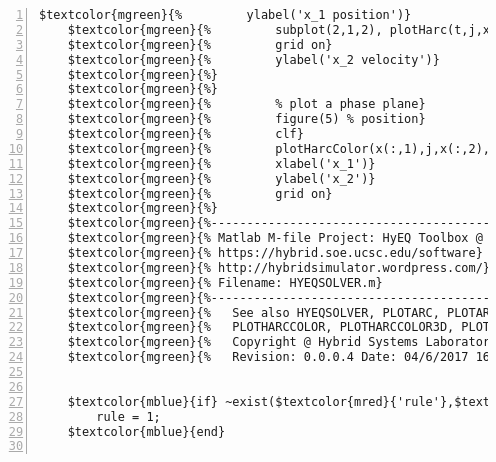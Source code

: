 \begin{Verbatim}[commandchars=\$\{\},numbers=left,numbersep=2pt]
    $textcolor{mgreen}{%         ylabel('x_1 position')} 
    $textcolor{mgreen}{%         subplot(2,1,2), plotHarc(t,j,x(:,2));} 
    $textcolor{mgreen}{%         grid on} 
    $textcolor{mgreen}{%         ylabel('x_2 velocity')} 
    $textcolor{mgreen}{%} 
    $textcolor{mgreen}{%} 
    $textcolor{mgreen}{%         % plot a phase plane} 
    $textcolor{mgreen}{%         figure(5) % position} 
    $textcolor{mgreen}{%         clf} 
    $textcolor{mgreen}{%         plotHarcColor(x(:,1),j,x(:,2),t);} 
    $textcolor{mgreen}{%         xlabel('x_1')} 
    $textcolor{mgreen}{%         ylabel('x_2')} 
    $textcolor{mgreen}{%         grid on} 
    $textcolor{mgreen}{%} 
    $textcolor{mgreen}{%--------------------------------------------------------------------------} 
    $textcolor{mgreen}{% Matlab M-file Project: HyEQ Toolbox @  Hybrid Systems Laboratory (HSL),} 
    $textcolor{mgreen}{% https://hybrid.soe.ucsc.edu/software} 
    $textcolor{mgreen}{% http://hybridsimulator.wordpress.com/} 
    $textcolor{mgreen}{% Filename: HYEQSOLVER.m} 
    $textcolor{mgreen}{%--------------------------------------------------------------------------} 
    $textcolor{mgreen}{%   See also HYEQSOLVER, PLOTARC, PLOTARC3, PLOTFLOWS, PLOTHARC,} 
    $textcolor{mgreen}{%   PLOTHARCCOLOR, PLOTHARCCOLOR3D, PLOTHYBRIDARC, PLOTJUMPS.} 
    $textcolor{mgreen}{%   Copyright @ Hybrid Systems Laboratory (HSL),} 
    $textcolor{mgreen}{%   Revision: 0.0.0.4 Date: 04/6/2017 16:26:00} 
     
     
    $textcolor{mblue}{if} ~exist($textcolor{mred}{'rule'},$textcolor{mred}{'var'}) 
        rule = 1; 
    $textcolor{mblue}{end} 
     

\end{Verbatim}

